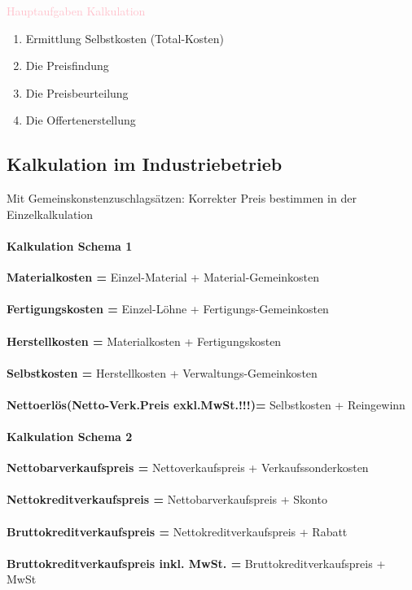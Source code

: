 \documentclass[../ZF_Wing.tex]{subfiles}
\begin{document}
\textcolor {pink} {Hauptaufgaben Kalkulation}
\begin{enumerate}
	\item Ermittlung Selbstkosten (Total-Kosten)
	\item Die Preisfindung
	\item Die Preisbeurteilung
	\item Die Offertenerstellung
\end{enumerate}


\subsection{Kalkulation im Industriebetrieb}

Mit Gemeinskonstenzuschlagsätzen: Korrekter Preis bestimmen in der Einzelkalkulation
\paragraph{Kalkulation Schema 1\\}
\textbf{Materialkosten =} Einzel-Material + Material-Gemeinkosten\\
\\
\textbf{Fertigungskosten =} Einzel-Löhne + Fertigungs-Gemeinkosten\\
\\
\textbf{Herstellkosten =} Materialkosten + Fertigungskosten\\
\\
\textbf{Selbstkosten =} Herstellkosten + Verwaltungs-Gemeinkosten\\
\\
\textbf{Nettoerlös(Netto-Verk.Preis exkl.MwSt.!!!)=} Selbstkosten + Reingewinn


\paragraph{Kalkulation Schema 2\\}


\textbf{Nettobarverkaufspreis =} Nettoverkaufspreis + Verkaufssonderkosten\\
\\
\textbf{Nettokreditverkaufspreis =} Nettobarverkaufspreis + Skonto\\
\\
\textbf{Bruttokreditverkaufspreis =} Nettokreditverkaufspreis + Rabatt\\
\\
\textbf{Bruttokreditverkaufspreis inkl. MwSt. =} Bruttokreditverkaufspreis + MwSt
\end{document}
